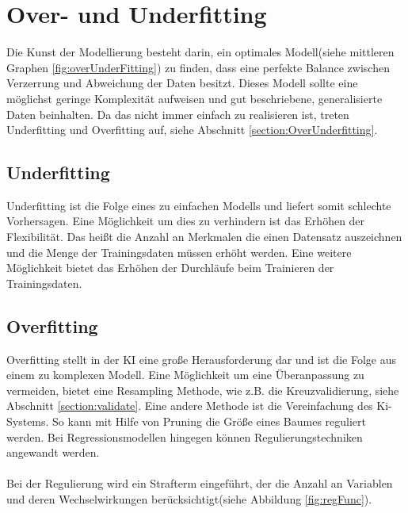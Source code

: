 \documentclass[12pt,oneside,a4paper,parskip]{scrbook}
\begin{document}
\section{Over- und Underfitting}
\label{section:preventData}
Die Kunst der Modellierung besteht darin, ein optimales Modell(siehe mittleren Graphen \ref{fig:overUnderFitting}) zu finden, dass eine perfekte Balance zwischen Verzerrung und Abweichung der Daten besitzt. Dieses Modell sollte eine möglichst geringe Komplexität aufweisen und gut beschriebene, generalisierte Daten beinhalten. Da das nicht immer einfach zu realisieren ist, treten Underfitting und Overfitting auf, siehe Abschnitt \ref{section:OverUnderfitting}.

\subsection{Underfitting}
Underfitting ist die Folge eines zu einfachen Modells und liefert somit schlechte Vorhersagen. Eine Möglichkeit um dies zu verhindern ist das Erhöhen der Flexibilität. Das heißt die Anzahl an Merkmalen die einen Datensatz auszeichnen und die Menge der Trainingsdaten müssen erhöht werden. Eine weitere Möglichkeit bietet das Erhöhen der Durchläufe beim Trainieren der Trainingsdaten.

\subsection{Overfitting}
Overfitting stellt in der KI eine große Herausforderung dar und ist die Folge aus einem zu komplexen Modell. Eine Möglichkeit um eine Überanpassung zu vermeiden, bietet eine Resampling Methode, wie z.B. die Kreuzvalidierung, siehe Abschnitt \ref{section:validate}. 
Eine andere Methode ist die Vereinfachung des Ki-Systems. So kann mit Hilfe von Pruning die Größe eines Baumes reguliert werden\cite{overUnderfittingNovu}. Bei Regressionsmodellen hingegen können Regulierungstechniken angewandt werden.
\\\\
Bei der Regulierung wird ein Strafterm eingeführt, der die Anzahl an Variablen und deren Wechselwirkungen berücksichtigt(siehe Abbildung \ref{fig:regFunc}).
\end{document}
